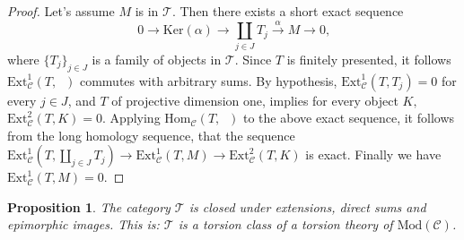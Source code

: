 \documentclass{amsart}
\theoremstyle{plain}
\newtheorem{proposition}{Proposition}
\numberwithin{equation}{section}
\begin{document}
\begin{proof}
Let's assume $M$ is in $\mathscr T$. Then there exists a short exact
sequence
\begin{equation}
0\rightarrow \mathrm{Ker}(\alpha )\rightarrow \coprod_{j\in J}T_{j}\xrightarrow{\alpha}M\rightarrow 0\text{,}  \label{TORA}
\end{equation}where $\{T_{j}\}_{j\in J}$ is a family of objects in $\mathcal{T} $. Since $T $ is finitely presented, it follows $\mathrm{Ext}_{\mathcal{C}}^{1}(T,\;\;) $ commutes with arbitrary sums. By hypothesis, $\mathrm{Ext}_{\mathcal{C}}^{1}(T,T_{j})=0$ for every $j\in J$, and $T$ of projective
dimension one, implies for every object $K,$ $\mathrm{Ext}_{\mathcal{C}}^{2}(T,K)=0$. Applying $\mathrm{Hom}_{\mathcal{C}}(T,\;\;)$ to the above
exact sequence, it follows from the long homology sequence, that the
sequence $\mathrm{Ext}_{\mathcal{C}}^{1}(T,\coprod_{j\in J}T_{j})\rightarrow
\mathrm{Ext}_{\mathcal{C}}^{1}(T,M)\rightarrow \mathrm{Ext}_{\mathcal{C}}^{2}(T,K)$ is exact. Finally we have $\mathrm{Ext}_{\mathcal{C}}^{1}(T,M)=0$.
\end{proof}

\begin{proposition}
\label{TORG} The category $\mathscr{T}$ is closed under extensions, direct
sums and epimorphic images. This is: $\mathscr{T}$ is a torsion class of a
torsion theory of $\mathrm{\mathrm{Mod}}(\mathcal{C})$.
\end{proposition}
\end{document}
